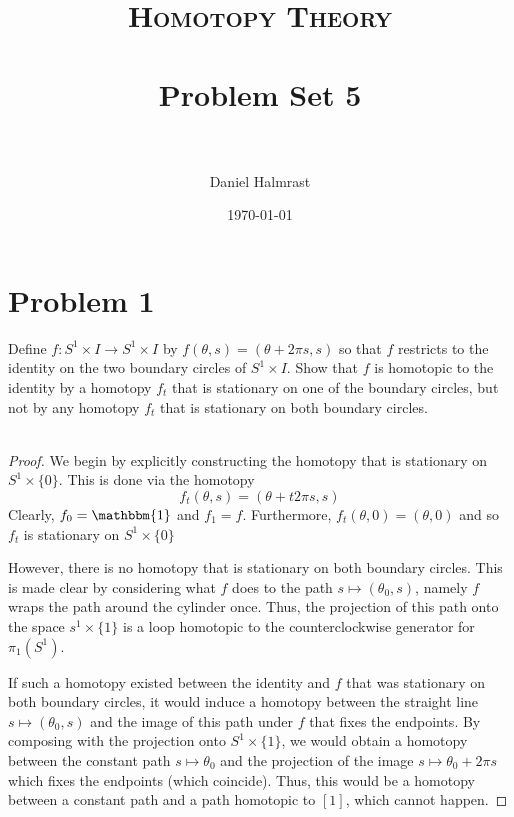 \documentclass[fontsize=11pt]{scrartcl} %
\title{	
\normalfont \normalsize 
\textsc{Homotopy Theory} \\ [25pt] %
\horrule{0.5pt} \\[0.4cm] %
\huge Problem Set 5 \\ %
\horrule{2pt} \\[0.5cm] %
}
\author{Daniel Halmrast} %
\date{\normalsize\today} %
\numberwithin{equation}{section} %
\numberwithin{figure}{section} %
\numberwithin{table}{section} %
\begin{document}
\maketitle %

\section*{Problem 1}
Define $f:S^1\times I\to S^1\times I$ by $f(\theta,s) = (\theta+2\pi s,s)$ so
that $f$ restricts to the identity on the two boundary circles of $S^1\times I$. 
Show that $f$ is homotopic to the identity by a homotopy $f_t$ that is
stationary on one of the boundary circles, but not by any homotopy $f_t$ that
is stationary on both boundary circles.
\\
\\
\begin{proof}
    We begin by explicitly constructing the homotopy that is stationary on
    $S^1\times\{0\}$. This is done via the homotopy
    \[
        f_t(\theta,s) = (\theta + t2\pi s,s)
    \]
    Clearly, $f_0 = \mathbbm{1}$ and $f_1 = f$. Furthermore, $f_t(\theta,0) =
    (\theta,0)$ and so $f_t$ is stationary on $S^1\times \{0\}$

    However, there is no homotopy that is stationary on both boundary circles.
    This is made clear by considering what $f$ does to the path $s\mapsto
    (\theta_0,s)$, namely $f$ wraps the path around the cylinder once. Thus, the
    projection of this path onto the space $s^1\times\{1\}$ is a loop homotopic
    to the counterclockwise generator for $\pi_1(S^1)$. 

    If such a homotopy existed between the identity and $f$ that was
    stationary on both boundary circles, it would induce a homotopy between the
    straight line $s\mapsto(\theta_0,s)$ and the image of this path under $f$
    that fixes the endpoints. By composing with the projection onto $S^1\times
    \{1\}$, we would obtain a homotopy between the constant path
    $s\mapsto\theta_0$ and the projection of the image $s\mapsto \theta_0 + 2\pi
    s$ which fixes the endpoints (which coincide). Thus, this would be a
    homotopy between a constant path and a path homotopic to $[1]$, which cannot
    happen.

\end{proof}


\newpage
\end{document}
